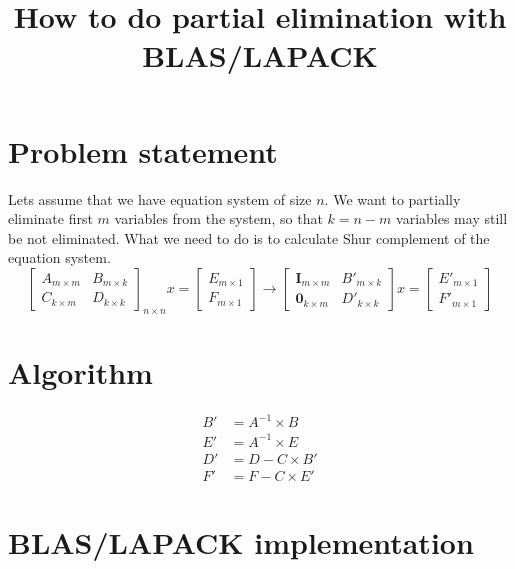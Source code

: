 \documentclass[12pt]{article}
\title{How to do partial elimination with BLAS/LAPACK}
\begin{document}
\maketitle

\section{Problem statement}
Lets assume that we have equation system of size $n$. We want to partially eliminate first $m$ variables from the system, so that $k = n - m$ variables may still be not eliminated. What we need to do is to calculate Shur complement of the equation system.
\begin{equation}
    \begin{bmatrix}
    A_{m × m} & B_{m × k} \\
    C_{k × m} & D_{k × k}
    \end{bmatrix}_{n × n} x = \begin{bmatrix}
    E_{m × 1} \\
    F_{m × 1} 
    \end{bmatrix}
\longrightarrow
    \begin{bmatrix}
    \boldsymbol{I}_{m × m} & B'_{m × k} \\
    \boldsymbol{0}_{k × m} & D'_{k × k}
    \end{bmatrix} x = \begin{bmatrix}
    E'_{m × 1} \\
    F'_{m × 1} 
    \end{bmatrix}
\end{equation}

\section{Algorithm}
\begin{align}
\label{step1}    B' &= A^{-1} \times B \\ 
\label{step2}    E' &= A^{-1} \times E \\
\label{step3}    D' &= D - C \times B' \\
\label{step4}    F' &= F - C \times E'
\end{align}


\section{BLAS/LAPACK implementation}
\end{document}
